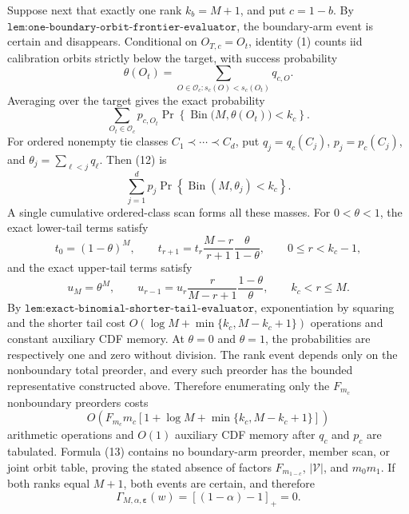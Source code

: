 Suppose next that exactly one rank \(k_b=M+1\), and put \(c=1-b\). By \(\texttt{lem:one-boundary-orbit-frontier-evaluator}\), the boundary-arm event is certain and disappears. Conditional on \(O_{T,c}=O_t\), identity (1) counts iid calibration orbits strictly below the target, with success probability
\[
\theta(O_t)=\sum_{O\in\mathcal O_c:s_c(O)<s_c(O_t)}q_{c,O}.
\]
Averaging over the target gives the exact probability
\[
\sum_{O_t\in\mathcal O_c}p_{c,O_t}
\Pr\!\left\{\operatorname{Bin}\bigl(M,\theta(O_t)\bigr)<k_c\right\}. \tag{12}
\]
For ordered nonempty tie classes \(C_1\prec\cdots\prec C_d\), put \(q_j=q_c(C_j)\), \(p_j=p_c(C_j)\), and \(\theta_j=\sum_{\ell<j}q_\ell\). Then (12) is
\[
\sum_{j=1}^d p_j\Pr\!\left\{\operatorname{Bin}(M,\theta_j)<k_c\right\}. \tag{13}
\]
A single cumulative ordered-class scan forms all these masses. For \(0<\theta<1\), the exact lower-tail terms satisfy
\[
t_0=(1-\theta)^M,\qquad
t_{r+1}=t_r\frac{M-r}{r+1}\frac{\theta}{1-\theta},\qquad 0\le r<k_c-1, \tag{14}
\]
and the exact upper-tail terms satisfy
\[
u_M=\theta^M,\qquad
u_{r-1}=u_r\frac{r}{M-r+1}\frac{1-\theta}{\theta},\qquad k_c<r\le M. \tag{15}
\]
By \(\texttt{lem:exact-binomial-shorter-tail-evaluator}\), exponentiation by squaring and the shorter tail cost \(O(\log M+\min\{k_c,M-k_c+1\})\) operations and constant auxiliary CDF memory. At \(\theta=0\) and \(\theta=1\), the probabilities are respectively one and zero without division. The rank event depends only on the nonboundary total preorder, and every such preorder has the bounded representative constructed above. Therefore enumerating only the \(F_{m_c}\) nonboundary preorders costs
\[
O\!\left(F_{m_c}m_c\left[1+\log M+\min\{k_c,M-k_c+1\}\right]\right) \tag{16}
\]
arithmetic operations and \(O(1)\) auxiliary CDF memory after \(q_c\) and \(p_c\) are tabulated. Formula (13) contains no boundary-arm preorder, member scan, or joint orbit table, proving the stated absence of factors \(F_{m_{1-c}}\), \(|\mathcal V|\), and \(m_0m_1\). If both ranks equal \(M+1\), both events are certain, and therefore
\[
\Gamma_{M,\alpha,\boldsymbol\varepsilon}(w)=[(1-\alpha)-1]_+=0. \tag{17}
\]

